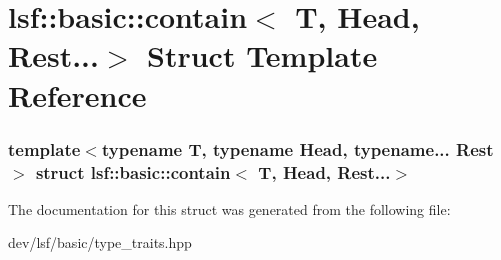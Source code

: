 \hypertarget{structlsf_1_1basic_1_1contain_3_01T_00_01Head_00_01Rest_8_8_8_4}{
\section{lsf::basic::contain$<$ T, Head, Rest...$>$ Struct Template Reference}
\label{structlsf_1_1basic_1_1contain_3_01T_00_01Head_00_01Rest_8_8_8_4}
}
\subsubsection*{template$<$typename T, typename Head, typename... Rest$>$ struct lsf::basic::contain$<$ T, Head, Rest...$>$}



The documentation for this struct was generated from the following file:\begin{DoxyCompactItemize}
\item 
dev/lsf/basic/type\_\-traits.hpp\end{DoxyCompactItemize}
